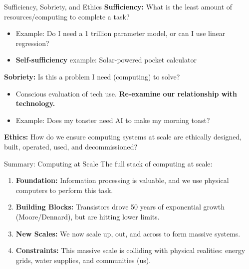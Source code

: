 \documentclass[aspectratio=169]{beamer}
\begin{document}
\begin{frame}{Sufficiency, Sobriety, and Ethics}
    \textbf{Sufficiency:} What is the least amount of resources/computing to complete a task?
    \begin{itemize}
        \item Example: Do I need a 1 trillion parameter model, or can I use linear regression?
        \item \textbf{Self-sufficiency} example: Solar-powered pocket calculator
    \end{itemize}
    \textbf{Sobriety:} Is this a problem I need (computing) to solve?
    \begin{itemize}
        \item Conscious evaluation of tech use. \textbf{Re-examine our relationship with technology.}
        \item Example: Does my toaster need AI to make my morning toast?
    \end{itemize}
    \textbf{Ethics:} How do we ensure computing systems at scale are ethically designed, built, operated, used, and decommissioned?
\end{frame}


\begin{frame}{Summary: Computing at Scale}
    The full stack of computing at scale:

    \vspace{0.5em}

    \begin{enumerate}
        \item \textbf{Foundation:} Information processing is valuable, and we use physical computers to perform this task.
        \item \textbf{Building Blocks:} Transistors drove 50 years of exponential growth (Moore/Dennard), but are hitting lower limits.
        \item \textbf{New Scales:} We now scale up, out, and across to form massive systems.
        \item \textbf{Constraints:} This massive scale is colliding with physical realities: energy grids, water supplies, and communities (us).
    \end{enumerate}


\end{frame}
\end{document}
